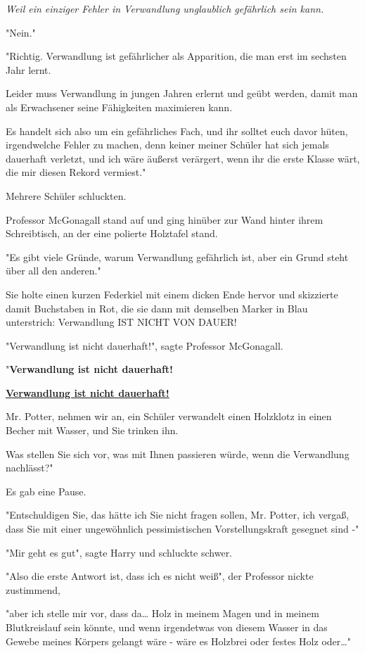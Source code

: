 {\emph{Weil ein einziger Fehler in Verwandlung unglaublich gefährlich sein kann.}

"Nein."

"Richtig. Verwandlung ist gefährlicher als Apparition, die man erst im sechsten Jahr lernt.

Leider muss Verwandlung in jungen Jahren erlernt und geübt werden, damit man als Erwachsener seine Fähigkeiten maximieren kann.

Es handelt sich also um ein gefährliches Fach, und ihr solltet euch davor hüten, irgendwelche Fehler zu machen, denn keiner meiner Schüler hat sich jemals dauerhaft verletzt, und ich wäre äußerst verärgert, wenn ihr die erste Klasse wärt, die mir diesen Rekord vermiest."

Mehrere Schüler schluckten.

Professor McGonagall stand auf und ging hinüber zur Wand hinter ihrem Schreibtisch, an der eine polierte Holztafel stand.

"Es gibt viele Gründe, warum Verwandlung gefährlich ist, aber ein Grund steht über all den anderen."

Sie holte einen kurzen Federkiel mit einem dicken Ende hervor und skizzierte damit Buchstaben in Rot, die sie dann mit demselben Marker in Blau unterstrich: Verwandlung IST NICHT VON DAUER!

"Verwandlung ist nicht dauerhaft!", sagte Professor McGonagall.

"\textbf{Verwandlung ist nicht dauerhaft!}

\textbf{\uline{Verwandlung ist nicht dauerhaft!}}

Mr. Potter, nehmen wir an, ein Schüler verwandelt einen Holzklotz in einen Becher mit Wasser, und Sie trinken ihn.

Was stellen Sie sich vor, was mit Ihnen passieren würde, wenn die Verwandlung nachlässt?"

Es gab eine Pause.

"Entschuldigen Sie, das hätte ich Sie nicht fragen sollen, Mr. Potter, ich vergaß, dass Sie mit einer ungewöhnlich pessimistischen Vorstellungskraft gesegnet sind -"

"Mir geht es gut", sagte Harry und schluckte schwer.

"Also die erste Antwort ist, dass ich es nicht weiß", der Professor nickte zustimmend,

"aber ich stelle mir vor, dass da… Holz in meinem Magen und in meinem Blutkreislauf sein könnte, und wenn irgendetwas von diesem Wasser in das Gewebe meines Körpers gelangt wäre - wäre es Holzbrei oder festes Holz oder…"

}
